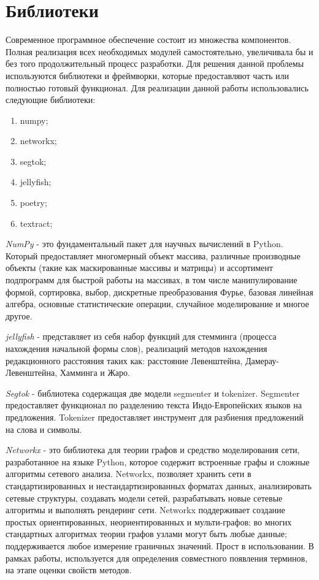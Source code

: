 \section{Библиотеки}
Современное программное обеспечение состоит из множества компонентов. 
Полная реализация всех необходимых модулей самостоятельно, увеличивала бы и без того продолжительный процесс разработки.
Для решения данной проблемы используются библиотеки и фреймворки, которые предоставляют часть или полностью готовый функционал.
Для реализации данной работы использовались следующие библиотеки:
\begin{enumerate}
	\item numpy;
	\item networkx;
	\item segtok;
	\item jellyfish;
	\item poetry;
	\item textract;
\end{enumerate}
\textit{NumPy} - это фундаментальный пакет для научных вычислений в Python. 
Который предоставляет многомерный объект массива, различные производные объекты (такие как маскированные массивы и матрицы) и ассортимент подпрограмм для быстрой работы на массивах, в том числе манипулирование формой, сортировка, выбор, дискретные преобразования Фурье, базовая линейная алгебра, основные статистические операции, случайное моделирование и многое другое.

\textit{jellyfish} -  представляет из себя набор функций для стемминга (процесса нахождения начальной формы слов), реализаций методов нахождения редакционного расстояния таких как: расстояние Левенштейна, Дамерау-Левенштейна, Хамминга и Жаро.

\textit{Segtok} - библиотека содержащая две модели segmenter и tokenizer. Segmenter предоставляет функционал по разделению текста Индо-Европейских языков на предложения.
Tokenizer предоставляет инструмент для разбиения предложений на слова и символы.

\textit{Networkx} - это библиотека для теории графов и средство моделирования сети, разработанное на языке Python, которое содержит встроенные графы и сложные алгоритмы сетевого анализа.
Networkx, позволяет хранить сети в стандартизированных и нестандартизированных форматах данных, анализировать сетевые структуры, создавать модели сетей, разрабатывать новые сетевые алгоритмы и выполнять рендеринг сети.
Networkx поддерживает создание простых ориентированных, неориентированных и мульти-графов; во многих стандартных алгоритмах теории графов узлами могут быть любые данные; поддерживается любое измерение граничных значений.
Прост в использовании.
В рамках работы, используется для определения совместного появления терминов, на этапе оценки свойств методов.

